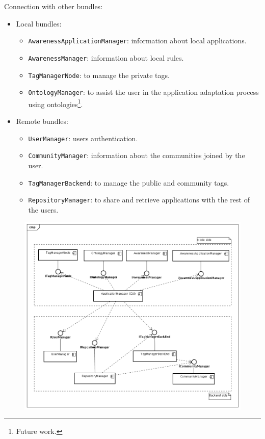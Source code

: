 \begin{frame}
Connection with other bundles:

\begin{itemize}
  \item Local bundles:
	\begin{itemize}
	  \item \texttt{AwarenessApplicationManager}:  information about local applications.
	  \item \texttt{AwarenessManager}: information about local rules.
	  \item \texttt{TagManagerNode}: to manage the private tags.
	  \item \texttt{OntologyManager}: to assist the user in the application
	  adaptation process using ontologies\footnote{Future work.}.
    \end{itemize}
   
   \item Remote bundles:
	\begin{itemize}
	  \item \texttt{UserManager}: users authentication.
	  \item \texttt{CommunityManager}: information about the
	  communities joined by the user.
	  \item \texttt{TagManagerBackend}: to manage the public and community
	  tags.
	  \item \texttt{RepositoryManager}: to share and retrieve applications
	  with the rest of the users.
    \end{itemize}
    
\end{itemize}

\end{frame}


\begin{frame}
	    
	\begin{figure}
	 	\includegraphics[scale=0.27]{img/ApplicationManagerComponentsDiagram.png}
	\end{figure}

\end{frame}

